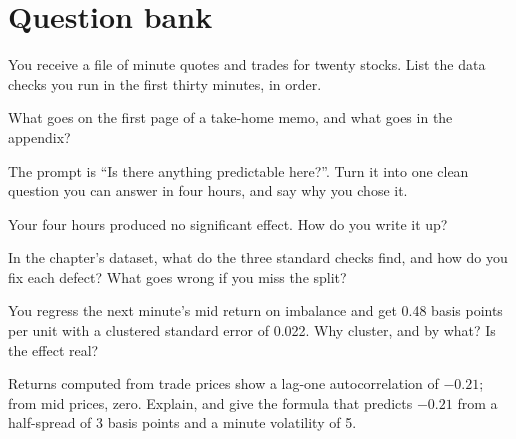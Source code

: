 \section{Question bank}

\begin{interviewq}\label{iq:iv:research-case-studies-and-take-homes:1}
You receive a file of minute quotes and trades for twenty stocks. List the data checks you run in the first thirty minutes,
in order.
\end{interviewq}

\begin{interviewq}\label{iq:iv:research-case-studies-and-take-homes:2}
What goes on the first page of a take-home memo, and what goes in the appendix?
\end{interviewq}

\begin{interviewq}\label{iq:iv:research-case-studies-and-take-homes:3}
The prompt is ``Is there anything predictable here?''. Turn it into one clean question you can answer in four hours, and say
why you chose it.
\end{interviewq}

\begin{interviewq}\label{iq:iv:research-case-studies-and-take-homes:4}
Your four hours produced no significant effect. How do you write it up?
\end{interviewq}

\begin{interviewq}\label{iq:iv:research-case-studies-and-take-homes:5}
In the chapter's dataset, what do the three standard checks find, and how do you fix each defect? What goes wrong if you miss
the split?
\end{interviewq}

\begin{interviewq}\label{iq:iv:research-case-studies-and-take-homes:6}
You regress the next minute's mid return on imbalance and get 0.48 basis points per unit with a clustered standard error of
0.022. Why cluster, and by what? Is the effect real?
\end{interviewq}

\begin{interviewq}\label{iq:iv:research-case-studies-and-take-homes:7}
Returns computed from trade prices show a lag-one autocorrelation of $-0.21$; from mid prices, zero. Explain, and give the
formula that predicts $-0.21$ from a half-spread of 3 basis points and a minute volatility of 5.
\end{interviewq}

